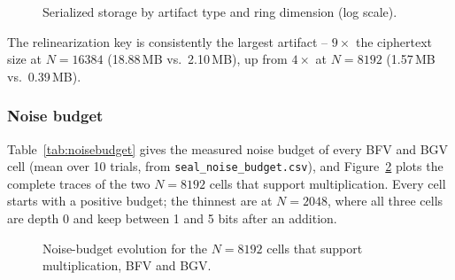 \begin{figure}[h!]
\centering

\caption{Serialized storage by artifact type and ring dimension (log scale).}
\label{fig:storage}
\end{figure}

The relinearization key is consistently the largest artifact -- $9\times$ the ciphertext size at $N{=}16384$ (18.88\,MB vs.\ 2.10\,MB), up from $4\times$ at $N{=}8192$ (1.57\,MB vs.\ 0.39\,MB).

\subsubsection*{Noise budget}

Table~\ref{tab:noisebudget} gives the measured noise budget of every BFV and BGV cell (mean over 10 trials, from \texttt{seal\_noise\_budget.csv}), and Figure~\ref{fig:noisebudget} plots the complete traces of the two $N{=}8192$ cells that support multiplication. Every cell starts with a positive budget; the thinnest are at $N{=}2048$, where all three cells are depth 0 and keep between 1 and 5 bits after an addition.

\begin{table}[h!]
\centering\small

\caption{Noise budget (bits) per cell and scheme. ``After last mult.'' is the budget after the last multiply--relinearize round performed in the trace (the deepest round the cell supports), with the number of rounds in parentheses; ``--'' marks depth-0 cells.}
\label{tab:noisebudget}
\end{table}

\begin{figure}[h!]
\centering

\caption{Noise-budget evolution for the $N{=}8192$ cells that support multiplication, BFV and BGV.}
\label{fig:noisebudget}
\end{figure}


